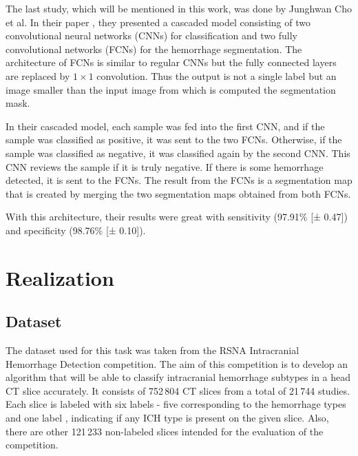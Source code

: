 \documentclass[thesis=B,english]{FITthesis}[2019/12/23]
\begin{document}
The last study, which will be mentioned in this work, was done by Junghwan Cho et al. In their paper \cite{Cho2019}, they presented a cascaded model consisting of two convolutional neural networks (CNNs) for classification and two fully convolutional networks (FCNs) for the hemorrhage segmentation. The architecture of FCNs is similar to regular CNNs but the fully connected layers are replaced by $1 \times 1$ convolution. Thus the output is not a single label but an image smaller than the input image from which is computed the segmentation mask.\cite{DBLP:journals/corr/ShelhamerLD16}

In their cascaded model, each sample was fed into the first CNN, and if the sample was classified as positive, it was sent to the two FCNs. Otherwise, if the sample was classified as negative, it was classified again by the second CNN. This CNN reviews the sample if it is truly negative. If there is some hemorrhage detected, it is sent to the FCNs. The result from the FCNs is a segmentation map that is created by merging the two segmentation maps obtained from both FCNs. 

With this architecture, their results were great with sensitivity (97.91\% [± 0.47]) and specificity (98.76\% [± 0.10]). 


\chapter{Realization}
\label{chap:realization}
\section{Dataset}
The dataset used for this task was taken from the RSNA Intracranial Hemorrhage Detection competition. The aim of this competition is to develop an algorithm that will be able to classify intracranial hemorrhage subtypes in a head CT slice accurately. It consists of 752\,804 CT slices from a total of 21\,744 studies. Each slice is labeled with six labels - five corresponding to the hemorrhage types and one label , indicating if any ICH type is present on the given slice. Also, there are other 121\,233 non-labeled slices intended for the evaluation of the competition.
\end{document}
